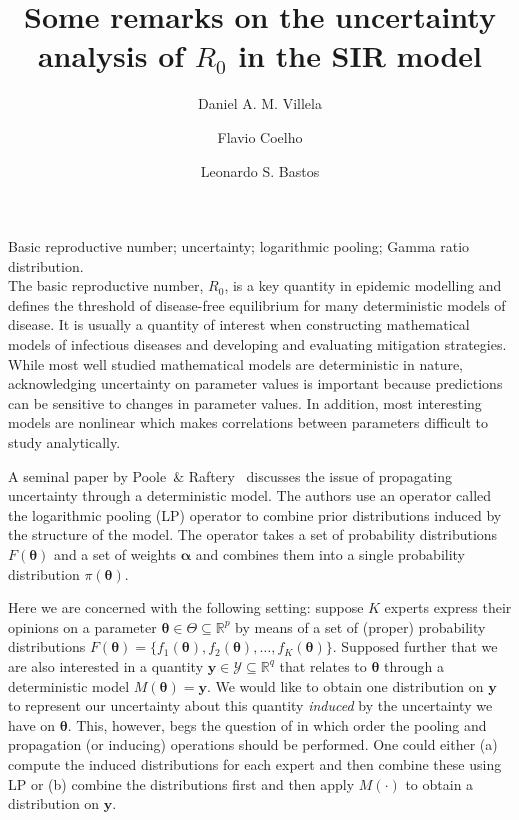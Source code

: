 \documentclass[11pt]{article}
\title{Some remarks on the uncertainty analysis of $R_0$ in the SIR model}
\author[1]{Daniel A. M. Villela}
\author[2]{Flavio Coelho}
\author[1]{Leonardo S. Bastos}
\affil[2]{School of Applied Mathematics, Getulio Vargas Foundation (FGV), Brazil,\,\emailaddress{fccoelho@fgv.br}} %
\date{\vspace{-6ex}} %
\newcommand{\keywords}[1]{\noindent{\large{\bf Keywords:}} #1\\}
\begin{document}
\maketitle

\keywords{Basic reproductive number; uncertainty; logarithmic pooling; Gamma ratio distribution.}

The basic reproductive number, $R_0$, is a key quantity in epidemic modelling and defines the threshold of disease-free equilibrium for many deterministic models of disease.
It is usually a quantity of interest when constructing mathematical models of infectious diseases and developing and evaluating mitigation strategies.
While most well studied mathematical models are deterministic in nature, acknowledging uncertainty on parameter values is important because predictions can be sensitive to changes in parameter values.
In addition, most interesting models are nonlinear which makes correlations between parameters difficult to study analytically.

A seminal paper by Poole~\& Raftery~\cite{poole2000} discusses the issue of propagating uncertainty through a deterministic model.
The authors use an operator called the logarithmic pooling (LP) operator to combine prior distributions induced by the structure of the model.
The operator takes a set of probability distributions $F(\boldsymbol\theta)$ and a set of weights $\boldsymbol\alpha$ and combines them into a single probability distribution $\pi(\boldsymbol\theta)$.

Here we are concerned with the following setting: suppose $K$ experts express their opinions on a parameter $\boldsymbol\theta \in \Theta \subseteq \mathbb{R}^{p}$ by means of a set of (proper) probability distributions $F(\boldsymbol\theta) = \{ f_1(\boldsymbol\theta), f_2(\boldsymbol\theta), \ldots, f_K(\boldsymbol\theta) \}$.
Supposed further that we are also interested in a quantity $\mathbf{y} \in  \mathcal{Y}  \subseteq \mathbb{R}^{q}$ that relates to $\boldsymbol\theta $ through a deterministic model $M(\boldsymbol\theta) = \mathbf{y}$.
We would like to obtain one distribution on $\mathbf{y}$ to represent our uncertainty about this quantity \textit{induced} by the uncertainty we have on $\boldsymbol\theta$.
This, however, begs the question of in which order the pooling and propagation (or inducing) operations should be performed.
One could either (a) compute the induced distributions for each expert and then combine these using LP or (b) combine the distributions first and then apply $M(\cdot)$ to obtain a distribution on $\mathbf{y}$.
\end{document}
